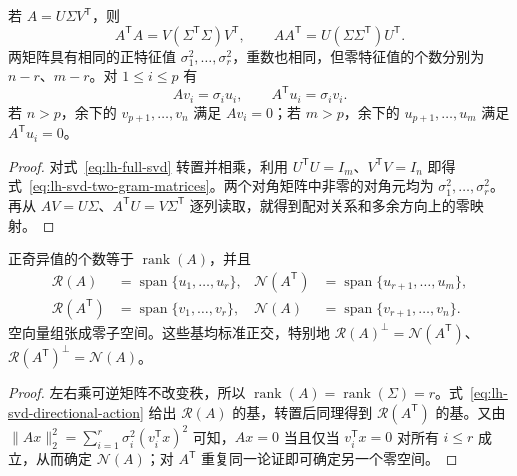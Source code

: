 \begin{proposition}[奇异值与两侧特征分解]
\label{prop:lh-svd-eigen-relations}
若 $A=U\Sigma V^{\mathsf T}$，则
\begin{equation}
A^{\mathsf T}A=V(\Sigma^{\mathsf T}\Sigma)V^{\mathsf T},\qquad
AA^{\mathsf T}=U(\Sigma\Sigma^{\mathsf T})U^{\mathsf T}.
\label{eq:lh-svd-two-gram-matrices}
\end{equation}
两矩阵具有相同的正特征值 $\sigma_1^2,\ldots,\sigma_r^2$，重数也相同，但零特征值的个数分别为 $n-r$、$m-r$。对 $1\leq i\leq p$ 有
\begin{equation}
Av_i=\sigma_i u_i,\qquad A^{\mathsf T}u_i=\sigma_i v_i.
\label{eq:lh-svd-paired-vectors}
\end{equation}
若 $n>p$，余下的 $v_{p+1},\ldots,v_n$ 满足 $Av_i=0$；若 $m>p$，余下的 $u_{p+1},\ldots,u_m$ 满足 $A^{\mathsf T}u_i=0$。
\end{proposition}
\begin{proof}
对式~\eqref{eq:lh-full-svd} 转置并相乘，利用 $U^{\mathsf T}U=I_m$、$V^{\mathsf T}V=I_n$ 即得式~\eqref{eq:lh-svd-two-gram-matrices}。两个对角矩阵中非零的对角元均为 $\sigma_1^2,\ldots,\sigma_r^2$。再从 $AV=U\Sigma$、$A^{\mathsf T}U=V\Sigma^{\mathsf T}$ 逐列读取，就得到配对关系和多余方向上的零映射。
\end{proof}

\begin{proposition}[秩与四个基本子空间]
\label{prop:lh-svd-four-subspaces}
正奇异值的个数等于 $\operatorname{rank}(A)$，并且
\begin{equation}
\begin{aligned}
\mathcal R(A)&=\operatorname{span}\{u_1,\ldots,u_r\},&
\mathcal N(A^{\mathsf T})&=\operatorname{span}\{u_{r+1},\ldots,u_m\},\\
\mathcal R(A^{\mathsf T})&=\operatorname{span}\{v_1,\ldots,v_r\},&
\mathcal N(A)&=\operatorname{span}\{v_{r+1},\ldots,v_n\}.
\end{aligned}
\label{eq:lh-svd-four-subspaces}
\end{equation}
空向量组张成零子空间。这些基均标准正交，特别地 $\mathcal R(A)^\perp=\mathcal N(A^{\mathsf T})$、$\mathcal R(A^{\mathsf T})^\perp=\mathcal N(A)$。
\end{proposition}
\begin{proof}
左右乘可逆矩阵不改变秩，所以 $\operatorname{rank}(A)=\operatorname{rank}(\Sigma)=r$。式~\eqref{eq:lh-svd-directional-action} 给出 $\mathcal R(A)$ 的基，转置后同理得到 $\mathcal R(A^{\mathsf T})$ 的基。又由 $\|Ax\|_2^2=\sum_{i=1}^r\sigma_i^2(v_i^{\mathsf T}x)^2$ 可知，$Ax=0$ 当且仅当 $v_i^{\mathsf T}x=0$ 对所有 $i\leq r$ 成立，从而确定 $\mathcal N(A)$；对 $A^{\mathsf T}$ 重复同一论证即可确定另一个零空间。
\end{proof}

